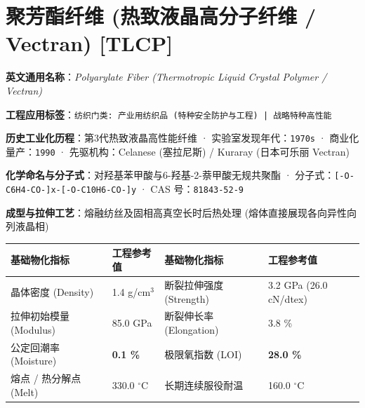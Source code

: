 \documentclass[11pt,openright,twoside,UTF8]{ctexbook}
\begin{document}
\section{聚芳酯纤维 (热致液晶高分子纤维 / Vectran) [TLCP]}
\label{sec:tlcp}

\noindent\textbf{英文通用名称}：\textit{Polyarylate Fiber (Thermotropic Liquid Crystal Polymer / Vectran)}\par
\noindent\textbf{工程应用标签}：\texttt{纺织门类: 产业用纺织品 (特种安全防护与工程) | 战略特种高性能}\par
\noindent\textbf{历史工业化历程}：第3代热致液晶高性能纤维 · 实验室发现年代：\texttt{1970s} · 商业化量产：\texttt{1990} · 先驱机构：Celanese (塞拉尼斯) / Kuraray (日本可乐丽 Vectran)\par
\noindent\textbf{化学命名与分子式}：对羟基苯甲酸与6-羟基-2-萘甲酸无规共聚酯 · 分子式：\texttt{[-O-C6H4-CO-]x-[-O-C10H6-CO-]y} · CAS 号：\texttt{81843-52-9}\par
\noindent\textbf{成型与拉伸工艺}：熔融纺丝及固相高真空长时后热处理 (熔体直接展现各向异性向列液晶相)\par

\vspace{0.15cm}
\begin{center}
\small
\begin{tabularx}{\textwidth}{p{3.8cm}Xp{3.8cm}X}
\toprule
\textbf{基础物化指标} & \textbf{工程参考值} & \textbf{基础物化指标} & \textbf{工程参考值} \\
\midrule
晶体密度 (Density) & 1.4 g/cm$^3$ & 断裂拉伸强度 (Strength) & 3.2 GPa (26.0 cN/dtex) \\
拉伸初始模量 (Modulus) & 85.0 GPa & 断裂伸长率 (Elongation) & 3.8 \% \\
公定回潮率 (Moisture) & \textbf{0.1 \%} & 极限氧指数 (LOI) & \textbf{28.0 \%} \\
熔点 / 热分解点 (Melt) & 330.0 $^\circ\mathrm{C}$ & 长期连续服役耐温 & 160.0 $^\circ\mathrm{C}$ \\
\bottomrule
\end{tabularx}
\end{center}
\vspace{0.15cm}
\end{document}

